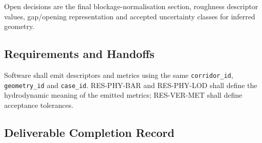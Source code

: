 Open decisions are the final blockage-normalisation section, roughness
descriptor values, gap/opening representation and accepted uncertainty
classes for inferred geometry.

\subsection{Requirements and Handoffs}
\label{sec:res-geo-met-requirements}

Software shall emit descriptors and metrics using the same
\texttt{corridor\_id}, \texttt{geometry\_id} and \texttt{case\_id}.
RES-PHY-BAR and RES-PHY-LOD shall define the hydrodynamic meaning of
the emitted metrics; RES-VER-MET shall define acceptance tolerances.

\subsection{Deliverable Completion Record}
\label{sec:res-geo-met-completion-record}

%
%
%
